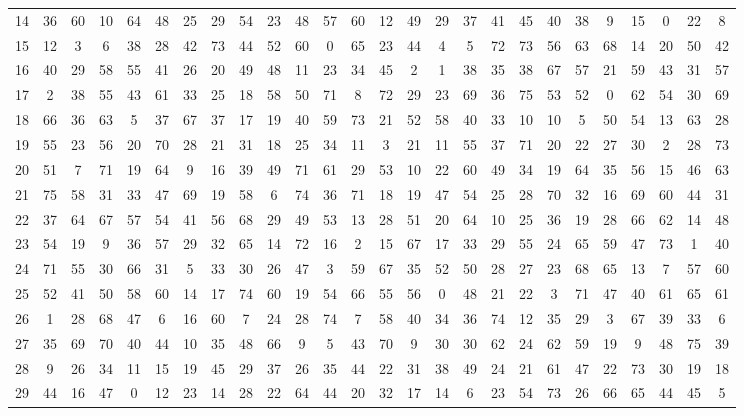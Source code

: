 \begin{table}
\begin{tabular}{c c c c c c c c c c c c c c c c c c c c c c c c c c }
14 & 36 & 60 & 10 & 64 & 48 & 25 & 29 & 54 & 23 & 48 & 57 & 60 & 12 & 49 & 29 & 37 & 41 & 45 & 40 & 38 & 9 & 15 & 0 & 22 & 8 \\
15 & 12 & 3 & 6 & 38 & 28 & 42 & 73 & 44 & 52 & 60 & 0 & 65 & 23 & 44 & 4 & 5 & 72 & 73 & 56 & 63 & 68 & 14 & 20 & 50 & 42 \\
16 & 40 & 29 & 58 & 55 & 41 & 26 & 20 & 49 & 48 & 11 & 23 & 34 & 45 & 2 & 1 & 38 & 35 & 38 & 67 & 57 & 21 & 59 & 43 & 31 & 57 \\
17 & 2 & 38 & 55 & 43 & 61 & 33 & 25 & 18 & 58 & 50 & 71 & 8 & 72 & 29 & 23 & 69 & 36 & 75 & 53 & 52 & 0 & 62 & 54 & 30 & 69 \\
18 & 66 & 36 & 63 & 5 & 37 & 67 & 37 & 17 & 19 & 40 & 59 & 73 & 21 & 52 & 58 & 40 & 33 & 10 & 10 & 5 & 50 & 54 & 13 & 63 & 28 \\
19 & 55 & 23 & 56 & 20 & 70 & 28 & 21 & 31 & 18 & 25 & 34 & 11 & 3 & 21 & 11 & 55 & 37 & 71 & 20 & 22 & 27 & 30 & 2 & 28 & 73 \\
20 & 51 & 7 & 71 & 19 & 64 & 9 & 16 & 39 & 49 & 71 & 61 & 29 & 53 & 10 & 22 & 60 & 49 & 34 & 19 & 64 & 35 & 56 & 15 & 46 & 63 \\
21 & 75 & 58 & 31 & 33 & 47 & 69 & 19 & 58 & 6 & 74 & 36 & 71 & 18 & 19 & 47 & 54 & 25 & 28 & 70 & 32 & 16 & 69 & 60 & 44 & 31 \\
22 & 37 & 64 & 67 & 57 & 54 & 41 & 56 & 68 & 29 & 49 & 53 & 13 & 28 & 51 & 20 & 64 & 10 & 25 & 36 & 19 & 28 & 66 & 62 & 14 & 48 \\
23 & 54 & 19 & 9 & 36 & 57 & 29 & 32 & 65 & 14 & 72 & 16 & 2 & 15 & 67 & 17 & 33 & 29 & 55 & 24 & 65 & 59 & 47 & 73 & 1 & 40 \\
24 & 71 & 55 & 30 & 66 & 31 & 5 & 33 & 30 & 26 & 47 & 3 & 59 & 67 & 35 & 52 & 50 & 28 & 27 & 23 & 68 & 65 & 13 & 7 & 57 & 60 \\
25 & 52 & 41 & 50 & 58 & 60 & 14 & 17 & 74 & 60 & 19 & 54 & 66 & 55 & 56 & 0 & 48 & 21 & 22 & 3 & 71 & 47 & 40 & 61 & 65 & 61 \\
26 & 1 & 28 & 68 & 47 & 6 & 16 & 60 & 7 & 24 & 28 & 74 & 7 & 58 & 40 & 34 & 36 & 74 & 12 & 35 & 29 & 3 & 67 & 39 & 33 & 6 \\
27 & 35 & 69 & 70 & 40 & 44 & 10 & 35 & 48 & 66 & 9 & 5 & 43 & 70 & 9 & 30 & 30 & 62 & 24 & 62 & 59 & 19 & 9 & 48 & 75 & 39 \\
28 & 9 & 26 & 34 & 11 & 15 & 19 & 45 & 29 & 37 & 26 & 35 & 44 & 22 & 31 & 38 & 49 & 24 & 21 & 61 & 47 & 22 & 73 & 30 & 19 & 18 \\
29 & 44 & 16 & 47 & 0 & 12 & 23 & 14 & 28 & 22 & 64 & 44 & 20 & 32 & 17 & 14 & 6 & 23 & 54 & 73 & 26 & 66 & 65 & 44 & 45 & 5 \\

\end{tabular}
\end{table}
